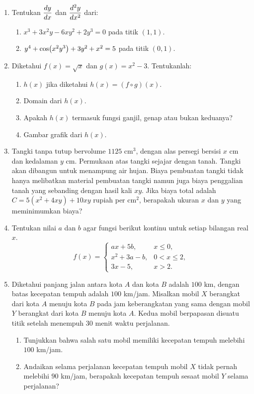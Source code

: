 \begin{enumerate}[leftmargin=*, label={\arabic*}.]
\item Tentukan $\displaystyle\frac{dy}{dx}$ dan $\displaystyle\frac{d^{2}y}{dx^{2}}$ dari:
\begin{enumerate}[label={\alph*}.]
    \item $x^{3}+3x^{2}y-6xy^{2}+2y^{3}=0$ pada titik $(1,1)$.
    \item $y^{4}+\cos\brk*{x^{2}y^{3}}+3y^{2}+x^{2}=5$ pada titik $(0,1)$.
\end{enumerate}
\item Diketahui $f(x)=\sqrt{x}$ dan $g(x)=x^{2}-3$. Tentukanlah:
\begin{enumerate}[label={\alph*}.]
    \item $h(x)$ jika diketahui $h(x)=(f \circ g)(x)$.
    \item Domain dari $h(x)$.
    \item Apakah $h(x)$ termasuk fungsi ganjil, genap atau bukan keduanya?
    \item Gambar grafik dari $h(x)$.
\end{enumerate}
\item Tangki tanpa tutup bervolume $1125$ cm$^3$, dengan alas persegi bersisi $x$ 
cm dan kedalaman $y$ cm. Permukaan atas tangki sejajar dengan tanah. Tangki akan 
dibangun untuk menampung air hujan. Biaya pembuatan tangki tidak hanya melibatkan 
material pembuatan tangki namun juga biaya penggalian tanah yang sebanding dengan 
hasil kali $xy$. Jika biaya total adalah $C=5(x^{2}+4xy)+10xy$ rupiah per cm$^2$, 
berapakah ukuran $x$ dan $y$ yang meminimumkan biaya?
\item Tentukan nilai $a$ dan $b$ agar fungsi berikut kontinu untuk setiap bilangan 
real $x$.
\[
    f(x)=
    \begin{cases}
        ax+5b, &x \leq 0,\\
        x^2+3a-b, &0 < x \leq 2,\\
        3x-5, &x > 2.
    \end{cases}
\]
\item Diketahui panjang jalan antara kota $A$ dan kota $B$ adalah $100$ km, dengan 
batas kecepatan tempuh adalah $100$ km/jam. Misalkan mobil $X$ berangkat dari kota 
$A$ menuju kota $B$ pada jam keberangkatan yang sama dengan mobil $Y$ berangkat 
dari kota $B$ menuju kota $A$. Kedua mobil berpapasan disuatu titik setelah 
menempuh 30 menit waktu perjalanan.
\begin{enumerate}[label={\alph*}.]
    \item Tunjukkan bahwa salah satu mobil memiliki kecepatan tempuh melebihi $100$ 
    km/jam.
    \item  Andaikan selama perjalanan kecepatan tempuh mobil $X$ tidak pernah melebihi
    $90$ km/jam, berapakah kecepatan tempuh sesaat mobil $Y$ selama perjalanan?
\end{enumerate}
\end{enumerate}
